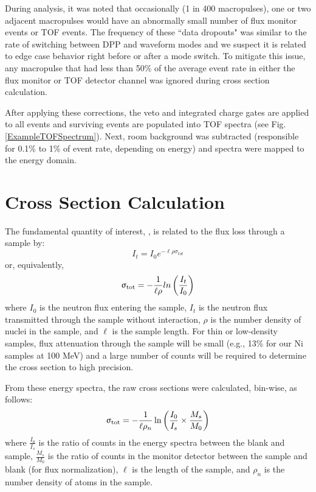 During analysis, it was noted that occasionally (1 in 400 macropulses), one or two 
adjacent macropulses would have an abnormally small number of flux monitor events or 
TOF events. The frequency of these ``data dropouts" was similar to the rate of
switching between DPP and waveform modes and we suspect it is related to edge
case behavior right before or after a mode switch. To mitigate this issue,
any macropulse that had less than 50\% of the average event rate in either the
flux monitor or TOF detector channel was ignored during cross section calculation.

After applying these corrections, the veto and integrated charge gates are applied to 
all events and surviving events are populated into TOF spectra (see Fig.
\ref{ExampleTOFSpectrum}). Next, room background was subtracted (responsible for 0.1\% to 
1\% of event rate, depending on energy) and spectra were mapped to the energy domain.

\section{Cross Section Calculation}
The fundamental quantity of interest, \tot, is related to the flux
loss through a sample by:
\begin{equation}
I_{t} = I_{0}e^{-{\ell\rho\sigma_{tot}}}
\end{equation}
or, equivalently,
\begin{equation}
    \upsigma_{\text{tot}} = -\frac{1}{\ell\rho}ln\left(\frac{I_{t}}{I_{0}}\right)
\end{equation}
where $I_{0}$ is the neutron flux entering the sample, $I_{t}$ is the neutron
flux transmitted through the sample without interaction, $\rho$ is the number
density of nuclei in the sample, and $\ell$ is the sample length. For thin
or low-density samples, flux attenuation through the sample will be small
(e.g., 13\% for our Ni samples at 100 MeV) and a large number
of counts will be required to determine the cross section to high
precision.

From these energy spectra, the raw cross sections were calculated, bin-wise, as follows:
$$
\upsigma_{\text{tot}} = -\frac{1}{\ell\rho_{n}}
\ln \left(\frac{I_{0}}{I_{s}}\times\frac{M_{s}}{M_{0}}\right)
$$
where $\frac{I_{0}}{I_{s}}$ is the ratio of counts in the energy spectra between 
the blank and sample, $\frac{M_{s}}{M_{0}}$ is the ratio of counts in the
monitor detector between the sample and blank (for flux normalization), $\ell$ is the length 
of the sample, and $\rho_{n}$ is the number density of atoms in the sample.

